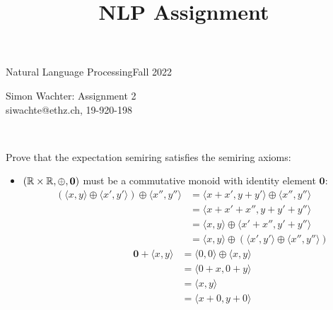 \documentclass[a4paper,12pt]{ETHexercise}
\title{NLP Assignment}
\begin{document}


\newcommand{\pair}[2]{{\langle #1 , #2 \rangle}}
\newcommand{\score}[2]{\text{score}_{\theta}(\langle #1, #2 \rangle, \boldsymbol{w})}
\newcommand{\sscore}[1]{\text{score}_{\theta}(#1, \boldsymbol{w})}

{}
{\Large Natural Language Processing}{Fall 2022}
\begin{center}
	{\Huge Simon Wachter: Assignment 2}\\
	\quad\newline
	siwachte@ethz.ch, 19-920-198\\
	\quad\newline
	\timestamp
\end{center}

\begin{question}\\
	\begin{subquestion}
		Prove that the expectation semiring satisfies the semiring axioms:\\
		\begin{itemize}
			\item  $(\mathbb{R} \times \mathbb{R}, \oplus, \mathbf{0})$ must be a commutative monoid with identity element $\mathbf{0}$:
			      \begin{align}
				      \left(\pair{x}{y} \oplus \pair{x'}{y'}\right) \oplus \pair{x''}{y''} & =       \pair{x + x'}{y + y'}      \oplus \pair{x''}{y''}              \\
				                                                                           & = \pair{x + x' + x''}{y + y' + y''}                                    \\
				                                                                           & = \pair{x}{y} \oplus \pair{x' + x''}{y' + y''}                         \\
				                                                                           & = \pair{x}{y} \oplus \left(\pair{x'}{y'} \oplus \pair{x''}{y''}\right)
			      \end{align}
			      \begin{align}
				      \mathbf{0} + \pair{x}{y} & = \pair{0}{0} \oplus \pair{x}{y} \\
				                               & = \pair{0 + x}{0 + y}            \\
				                               & = \pair{x}{y}                    \\
				                               & = \pair{x + 0}{y + 0}            \\

\end{align}
\end{itemize}
\end{subquestion}
\end{question}
\end{document}
